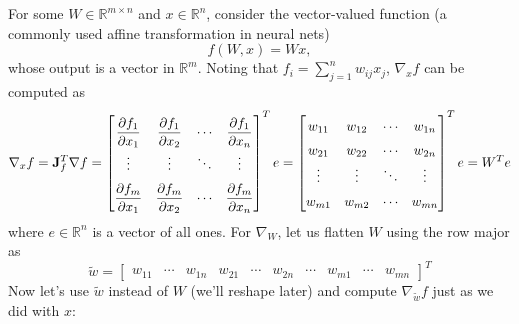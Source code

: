 For some $W \in \mathbb{R}^{m \times n}$ and $x \in \mathbb{R}^n$, consider the vector-valued function (a commonly used affine transformation in neural nets)
$$
f(W, x) = Wx,
$$
whose output is a vector in $\mathbb{R}^m$. Noting that $f_i = \sum_{j=1}^n w_{ij} x_j$, $\nabla_x f$ can be computed as
$$
\renewcommand{\arraystretch}{2}
\nabla_x f = \J_f^T \nabla f =
\begin{bmatrix}
    \dfrac{\partial f_1}{\partial x_1} & \dfrac{\partial f_1}{\partial x_2} & \cdots & \dfrac{\partial f_1}{\partial x_n} \\
    \vdots & \vdots & \ddots & \vdots \\
    \dfrac{\partial f_m}{\partial x_1} & \dfrac{\partial f_m}{\partial x_2} & \cdots & \dfrac{\partial f_m}{\partial x_n}
\end{bmatrix}^T e
\renewcommand{\arraystretch}{1.5}
= \begin{bmatrix}
    w_{11} & w_{12} & \cdots & w_{1n} \\
    w_{21} & w_{22} & \cdots & w_{2n} \\
    \vdots & \vdots & \ddots & \vdots \\
    w_{m1} & w_{m2} & \cdots & w_{mn} \\
\end{bmatrix}^T e = W^T e
$$
where $e \in \mathbb{R}^n$ is a vector of all ones. For $\nabla_W$, let us flatten $W$ using the row major as
$$
\widetilde{w} = \begin{bmatrix}
    w_{11} & \cdots & w_{1n} & w_{21} & \cdots & w_{2n} & \cdots & w_{m1} & \cdots & w_{mn}
    \end{bmatrix}^T
$$
Now let's use $\widetilde{w}$ instead of $W$ (we'll reshape later) and compute $\nabla_{\widetilde{w}} f$ just as we did with $x$:
